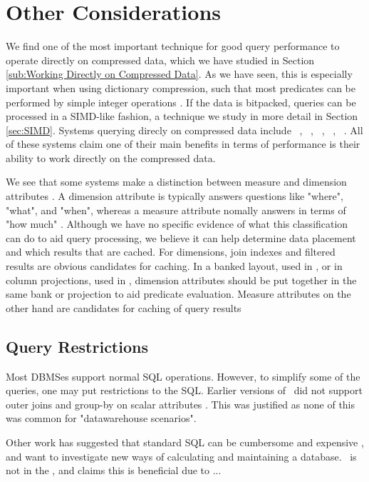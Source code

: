 \section{Other Considerations}
\label{sec:Other Considerations}
We find one of the most important technique for good query performance to operate directly on compressed data, which we have studied in Section \ref{sub:Working Directly on Compressed Data}. As we have seen, this is especially important when using dictionary compression, such that most predicates can be performed by simple integer operations \cite{Abadi2008-dd}. If the data is bitpacked, queries can be processed in a SIMD-like fashion, a technique we study in more detail in Section \ref{sec:SIMD}. Systems querying direcly on compressed data include \cstore~\cite{Stonebraker-qz}, \ibm~\cite{Raman2013-em}, \mssql~\cite{Larson2013-mc}, \blink~\cite{Johnson2008-cp}, \sapnw~\cite{Lemke2010-is}. All of these systems claim one of their main benefits in terms of performance is their ability to work directly on the compressed data.


We see that some systems make a distinction between measure and dimension attributes \cite{Kamkolkar2015-iq, Johnson2008-cp}. A dimension attribute is typically answers questions like "where", "what", and "when", whereas a measure attribute nomally answers in terms of "how much" \cite{noauthor_undated-es}. Although we have no specific evidence of what this classification can do to aid query processing, we believe it can help determine data placement and which results that are cached. For dimensions, join indexes and filtered results are obvious candidates for caching. In a banked layout, used in \blink, or in column projections, used in \cstore, dimension attributes should be put together in the same bank or projection to aid predicate evaluation. Measure attributes on the other hand are candidates for caching of query results

\subsection{Query Restrictions}
\label{sub:Query Restrictions}
Most DBMSes support normal SQL operations. However, to simplify some of the queries, one may put restrictions to the SQL. Earlier versions of \mssql~did not support outer joins and group-by on scalar attributes \cite{Larson2013-mc}. This was justified as none of this was common for "datawarehouse scenarios".

Other work has suggested that standard SQL can be cumbersome and expensive \cite{Plattner2014-fr}, and want to investigate new ways of calculating and maintaining a database. \qlikview~is not in the , and claims this is beneficial due to ... 


